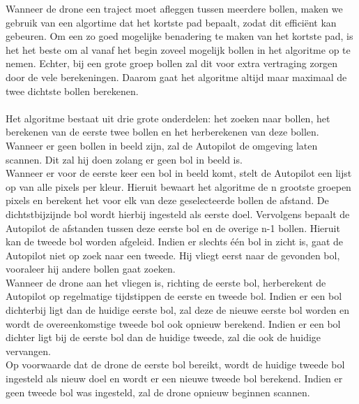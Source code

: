 \noindent
Wanneer de drone een traject moet afleggen tussen meerdere bollen, maken we gebruik van een algortime dat het kortste pad bepaalt, zodat dit effici\"ent kan gebeuren. Om een zo goed mogelijke benadering te maken van het kortste pad, is het het beste om al vanaf het begin zoveel mogelijk bollen in het algoritme op te nemen. Echter, bij een grote groep bollen zal dit voor extra vertraging zorgen door de vele berekeningen. Daarom gaat het algoritme altijd maar maximaal de twee dichtste bollen berekenen.
\\
\\
Het algoritme bestaat uit drie grote onderdelen: het zoeken naar bollen, het berekenen van de eerste twee bollen en het herberekenen van deze bollen.
\\
Wanneer er geen bollen in beeld zijn, zal de Autopilot de omgeving laten scannen. Dit zal hij doen zolang er geen bol in beeld is.
\\
Wanneer er voor de eerste keer een bol in beeld komt, stelt de Autopilot een lijst op van alle pixels per kleur. Hieruit bewaart het algoritme de n grootste groepen pixels en berekent het voor elk van deze geselecteerde bollen de afstand. De dichtstbijzijnde bol wordt hierbij ingesteld als eerste doel. Vervolgens bepaalt de Autopilot de afstanden tussen deze eerste bol en de overige n-1 bollen. Hieruit kan de tweede bol worden afgeleid. Indien er slechts \'e\'en bol in zicht is, gaat de Autopilot niet op zoek naar een tweede. Hij vliegt eerst naar de gevonden bol, vooraleer hij andere bollen gaat zoeken.
\\
Wanneer de drone aan het vliegen is, richting de eerste bol, herberekent de Autopilot op regelmatige tijdstippen de eerste en tweede bol. Indien er een bol dichterbij ligt dan de huidige eerste bol, zal deze de nieuwe eerste bol worden en wordt de overeenkomstige tweede bol ook opnieuw berekend. Indien er een bol dichter ligt bij de eerste bol dan de huidige tweede, zal die ook de huidige vervangen.
\\
Op voorwaarde dat de drone de eerste bol bereikt, wordt de huidige tweede bol ingesteld als nieuw doel en wordt er een nieuwe tweede bol berekend. Indien er geen tweede bol was ingesteld, zal de drone opnieuw beginnen scannen.